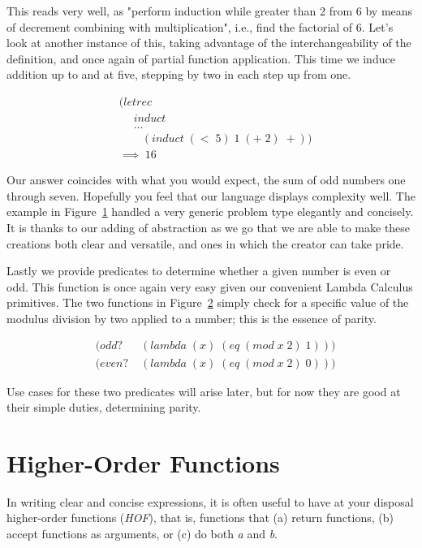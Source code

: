 This reads very well, as "perform induction while greater than 2 from 6 by means 
of decrement combining with multiplication", i.e., find the factorial of 6. Let's 
look at another instance of this, taking advantage of the interchangeability of 
the definition, and once again of partial function application. This time we 
induce addition up to and at five, stepping by two in each step up from one.

\begin{figure}[htp]
\footnotesize
\caption{}\label{fig:inductive1to5}
\begin{align*}
& (letrec \; 
\\& \quad \; induct \; 
\\& \quad \; \dots
\\& \qquad (induct \; (< \; 5) \; 1 \; (+ \; 2) \; +))
\\& \implies \; 16
\end{align*}
\end{figure}

Our answer coincides with what you would expect, the sum of odd numbers one
through seven. Hopefully you feel that our language displays complexity well.
The example in Figure~\ref{fig:inductive1to5} handled a very generic problem
type elegantly and concisely. It is thanks to our adding of abstraction as we
go that we are able to make these creations both clear and versatile, and ones
in which the creator can take pride.

Lastly we provide predicates to determine whether a given number is even or
odd.  This function is once again very easy given our convenient Lambda
Calculus primitives. The two functions in Figure~\ref{fig:oddEvenDef} simply
check for a specific value of the modulus division by two applied to a number;
this is the essence of parity.

\begin{figure}[htp]
\footnotesize
\caption{}\label{fig:oddEvenDef}
\begin{align*}
& (odd? \; &(lambda \; (x) \; (eq \; (mod \; x \; 2) \; 1)))
\\& (even? \; &(lambda \; (x) \; (eq \; (mod \; x \; 2) \; 0)))
\end{align*}
\end{figure}

Use cases for these two predicates will arise later, but for now they are good at 
their simple duties, determining parity.

\section{Higher-Order Functions}
In writing clear and concise expressions, it is often useful to have at your 
disposal higher-order functions (\emph{HOF}), that is, functions that (a) return 
functions, (b) accept functions as arguments, or (c) do both \emph{a} and \emph{b}.

